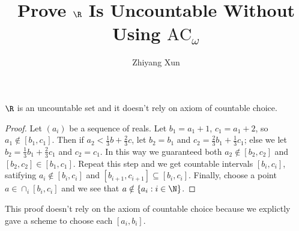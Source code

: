 
\author{Zhiyang Xun}
\title{Prove $\R$ Is Uncountable Without Using $\text{AC}_\omega$}


 
\maketitle

\begin{tcolorbox}
\begin{theorem*} 
    $\R$ is an uncountable set and it doesn't rely on axiom of countable choice.
\end{theorem*} 
\end{tcolorbox}

\begin{proof}
Let $(a_i)$ be a sequence of reals.
Let $b_1 = a_1 + 1$, $c_1 = a_1 + 2$, so $a_1 \notin [b_1, c_1]$.
Then if $a_2 < \frac{1}{3}b + \frac{2}{3}c$, let $b_2 = b_1$ and $c_2 = \frac{2}{3}b_1 + \frac{1}{3}c_1$;
else we let $b_2 = \frac{1}{3}b_1 + \frac{2}{3}c_1$ and $c_2 = c_1$. 
In this way we guaranteed both $a_2 \notin [b_2, c_2]$ and $[b_2, c_2] \in [b_1, c_1]$.
Repeat this step and we get countable intervals $[b_i, c_i]$, satifying $a_i \notin [b_i, c_i]$ and $[b_{i+1}, c_{i+1}] \subseteq [b_i, c_i]$.
Finally, choose a point $a \in \cap_i[b_i, c_i]$ and we see that $a \notin \{a_i : i \in \N\}$.
\end{proof} 

This proof doesn't rely on the axiom of countable choice because we explictly gave a scheme to choose each $[a_i, b_i]$.

